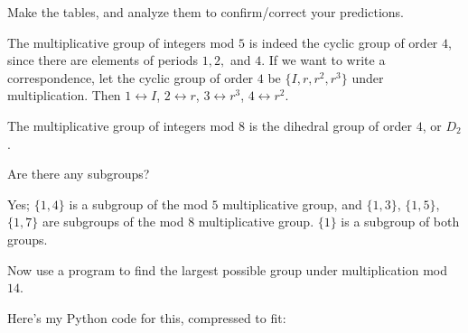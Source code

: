 \documentclass[../gatm_answers.tex]{subfiles}
\begin{document}
\begin{inner_problem}
\item Make the tables, and analyze them to confirm/correct your predictions.
\end{inner_problem}

The multiplicative group of integers mod $5$ is indeed the cyclic group of order $4$, since there are elements of periods $1,2,$ and $4$. If we want to write a correspondence, let the cyclic group of order $4$ be $\{I,r,r^2,r^3\}$ under multiplication. Then $1\leftrightarrow I$, $2\leftrightarrow r$, $3\leftrightarrow r^3$, $4\leftrightarrow r^2$.

The multiplicative group of integers mod $8$ is the dihedral group of order $4$, or $D_2$.

\begin{inner_problem}
\item Are there any subgroups?
\end{inner_problem}

Yes; $\{1,4\}$ is a subgroup of the mod $5$ multiplicative group, and $\{1,3\}$, $\{1,5\}$, $\{1,7\}$ are subgroups of the mod $8$ multiplicative group. $\{1\}$ is a subgroup of both groups.

\begin{outer_problem}
\item Now use a program to find the largest possible group under multiplication mod $14$.
\end{outer_problem}

Here's my Python code for this, compressed to fit:
\end{document}
